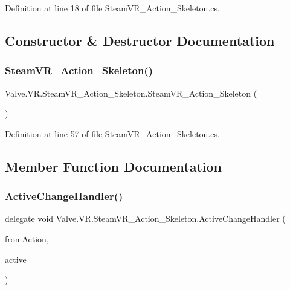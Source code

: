 Definition at line 18 of file Steam\+V\+R\+\_\+\+Action\+\_\+\+Skeleton.\+cs.



\subsection{Constructor \& Destructor Documentation}
\mbox{\label{class_valve_1_1_v_r_1_1_steam_v_r___action___skeleton_ab6d11fab47009a0f412c17b179749dc5}} 
\subsubsection{\texorpdfstring{SteamVR\_Action\_Skeleton()}{SteamVR\_Action\_Skeleton()}}
{\footnotesize\ttfamily Valve.\+V\+R.\+Steam\+V\+R\+\_\+\+Action\+\_\+\+Skeleton.\+Steam\+V\+R\+\_\+\+Action\+\_\+\+Skeleton (\begin{DoxyParamCaption}{ }\end{DoxyParamCaption})}



Definition at line 57 of file Steam\+V\+R\+\_\+\+Action\+\_\+\+Skeleton.\+cs.



\subsection{Member Function Documentation}
\mbox{\label{class_valve_1_1_v_r_1_1_steam_v_r___action___skeleton_ae329ff2582f41c7ec52ecdf3b34b345a}} 
\subsubsection{\texorpdfstring{ActiveChangeHandler()}{ActiveChangeHandler()}}
{\footnotesize\ttfamily delegate void Valve.\+V\+R.\+Steam\+V\+R\+\_\+\+Action\+\_\+\+Skeleton.\+Active\+Change\+Handler (\begin{DoxyParamCaption}\item[{\mbox{\hyperlink{class_valve_1_1_v_r_1_1_steam_v_r___action___skeleton}{Steam\+V\+R\+\_\+\+Action\+\_\+\+Skeleton}}}]{from\+Action,  }\item[{bool}]{active }\end{DoxyParamCaption})}

